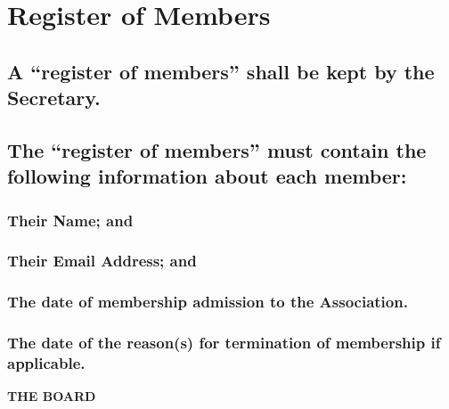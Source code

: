 \documentclass{article}
\newenvironment{subs}
  {\adjustwidth{2em}{0pt}}
  {\endadjustwidth}
\begin{document}
\section{Register of Members}
\begin{subs}
\subsection{A ``register of members'' shall be kept by the Secretary.}
\subsection{The ``register of members'' must contain the following information about each member:}
\begin{subs}
\subsubsection{Their Name; and}
\subsubsection{Their Email Address; and}
\subsubsection{The date of membership admission to the Association.}
\subsubsection{The date of the reason(s) for termination of membership if applicable.}
\end{subs}
\end{subs}

\vspace{5mm}
{\large\bf THE BOARD\par}
\hrulefill
\vspace{5mm}
\end{document}
